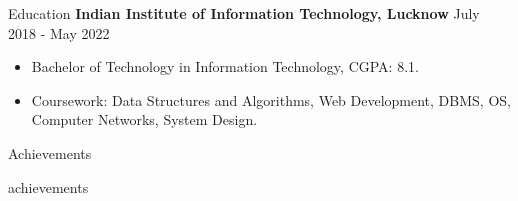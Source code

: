 \documentclass{resume}
\begin{document}
\begin{rSection}{Education}
    {\bf Indian Institute of Information Technology, Lucknow} \hfill {July 2018 - May 2022} \\
    \vspace{-1pt}
    \begin{itemize}
        \itemsep -3pt {}
        \item Bachelor of Technology in Information Technology, CGPA: 8.1.
        \item Coursework: Data Structures and Algorithms, Web Development, DBMS, OS, Computer Networks, System Design.
    \end{itemize}
\end{rSection}

\vspace{-5pt}
\begin{rSection}{Achievements}
    \begin{itemize}
        \itemsep 1pt {}
        \vspace{3pt}
        {{ achievements }}
    \end{itemize}
\end{rSection}
\end{document}
